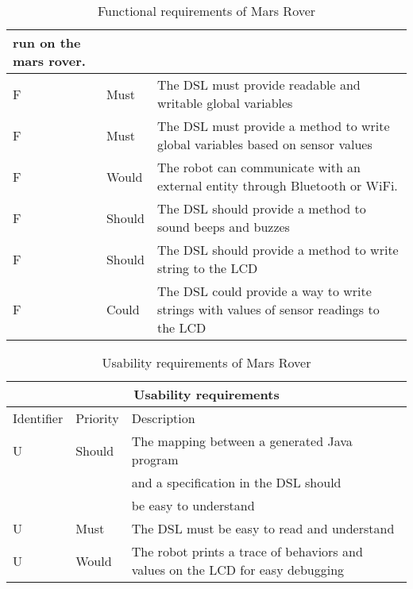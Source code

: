 \begin{table}[H]
\begin{tabular}{|l|l|l|}
			run on the mars rover. \\  \hline
		F\doTCC & Must & The DSL must provide readable and writable global
			variables \\  \hline
		F\doTCC & Must & The DSL must provide a method to write global variables
			based on sensor values \\  \hline
		F\doTCC & Would & The robot can communicate with an external entity
			through Bluetooth or WiFi. \\  \hline
		F\doTCC & Should & The DSL should provide a method to sound beeps and
			buzzes \\  \hline
		F\doTCC & Should & The DSL should provide a method to write string to
			the LCD \\  \hline
		F\doTCC & Could & The DSL could provide a way to write strings with
			values of sensor readings to the LCD \\  
		\hline
	\end{tabular}
\caption{Functional requirements of Mars Rover}
\label{tbl:functionalReq}
\end{table}

\setcounter{TCC}{1}
\begin{table}[H]
	\centering
	\begin{tabular}{|l|l|l|}
		\hline
		\multicolumn{3}{|c|}{Usability requirements} \\  \hline
		\hline
		Identifier & Priority & Description \\  
		\hline
		\hline
		U\doTCC & Should & The mapping between a generated Java program \\  
				&		& and a specification in the DSL should \\  
				& 		& be easy to understand \\  \hline
		U\doTCC & Must & The DSL must be easy to read and understand \\  \hline
		U\doTCC & Would & The robot prints a trace of behaviors and values on
			the LCD for easy debugging \\  
		\hline
	\end{tabular}
\caption{Usability requirements of Mars Rover}
\label{tbl:usabilityReq}
\end{table}

